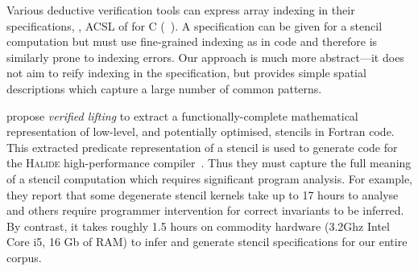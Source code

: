 \noindent
Various deductive verification tools can express array indexing in their
specifications, \eg{}, ACSL of \citet{baudin2008acsl} for C
(\eg{}~\citet[Example 3.4.1]{burghardt2010acsl}). A specification can be given
for a stencil computation but must use fine-grained indexing as in code and
therefore is similarly prone to indexing errors. Our approach is much more
abstract---it does not aim to reify indexing in the specification, but
provides simple spatial descriptions which capture a large number of common
patterns.

\citet{kamil2016verified} propose \emph{verified lifting} to extract a
functionally-complete mathematical representation of low-level, and potentially
optimised, stencils in Fortran code. This extracted predicate representation of
a stencil is used to generate code for the \textsc{Halide} high-performance
compiler~\citep{ragan2013halide}. Thus they must capture the full meaning of a
stencil computation which requires significant program analysis. For example,
they report that some degenerate stencil kernels take up to 17 hours to analyse
and others require programmer intervention for correct invariants to be
inferred. By contrast, it takes roughly 1.5 hours on commodity
hardware (3.2Ghz Intel Core i5, 16 Gb of RAM) to infer and generate
stencil specifications for our entire corpus.


